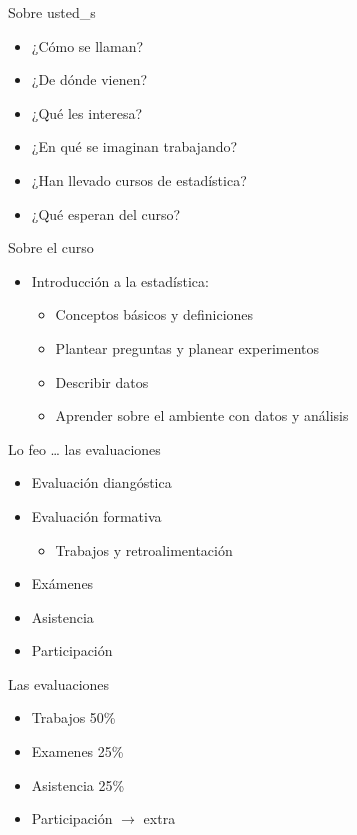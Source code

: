 \documentclass[
  11pt,
  ignorenonframetext,
]{beamer}
\providecommand{\tightlist}{%
  \setlength{\itemsep}{0pt}\setlength{\parskip}{0pt}}
\begin{document}
\begin{frame}{Sobre usted\_s}
\protect\hypertarget{sobre-usted_s}{}
\begin{itemize}
\tightlist
\item
  ¿Cómo se llaman?
\item
  ¿De dónde vienen?
\item
  ¿Qué les interesa?
\item
  ¿En qué se imaginan trabajando?
\item
  ¿Han llevado cursos de estadística?
\item
  ¿Qué esperan del curso?
\end{itemize}
\end{frame}

\begin{frame}{Sobre el curso}
\protect\hypertarget{sobre-el-curso}{}
\begin{itemize}
\item
  Introducción a la estadística:

  \begin{itemize}
  \tightlist
  \item
    Conceptos básicos y definiciones
  \item
    Plantear preguntas y planear experimentos
  \item
    Describir datos
  \item
    Aprender sobre el ambiente con datos y análisis
  \end{itemize}
\end{itemize}
\end{frame}

\begin{frame}{Lo feo \ldots{} las evaluaciones}
\protect\hypertarget{lo-feo-las-evaluaciones}{}
\begin{itemize}
\item
  Evaluación diangóstica
\item
  Evaluación formativa

  \begin{itemize}
  \tightlist
  \item
    Trabajos y retroalimentación
  \end{itemize}
\item
  Exámenes
\item
  Asistencia
\item
  Participación
\end{itemize}
\end{frame}

\begin{frame}{Las evaluaciones}
\protect\hypertarget{las-evaluaciones}{}
\begin{itemize}
\tightlist
\item
  Trabajos 50\%
\item
  Examenes 25\%
\item
  Asistencia 25\%
\item
  Participación \(\rightarrow\) extra
\end{itemize}
\end{frame}
\end{document}
